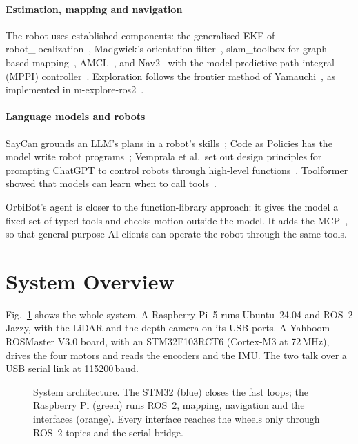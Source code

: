 \documentclass[11pt]{article}
\begin{document}
\paragraph{Estimation, mapping and navigation} The robot uses established components: the generalised EKF of robot\_localization~\cite{moore2014ekf}, Madgwick's orientation filter~\cite{madgwick2010}, slam\_toolbox for graph-based mapping~\cite{macenski2021slam}, AMCL~\cite{thrun2005probabilistic}, and Nav2~\cite{macenski2020nav2} with the model-predictive path integral (MPPI) controller~\cite{williams2017mppi}. Exploration follows the frontier method of Yamauchi~\cite{yamauchi1997frontier}, as implemented in m-explore-ros2~\cite{mexplore}.

\paragraph{Language models and robots} SayCan grounds an LLM's plans in a robot's skills~\cite{ahn2022saycan}; Code as Policies has the model write robot programs~\cite{liang2023code}; Vemprala et al.\ set out design principles for prompting ChatGPT to control robots through high-level functions~\cite{vemprala2024chatgpt}. Toolformer showed that models can learn when to call tools~\cite{schick2023toolformer}.

OrbiBot's agent is closer to the function-library approach: it gives the model a fixed set of typed tools and checks motion outside the model. It adds the MCP~\cite{mcp2024}, so that general-purpose AI clients can operate the robot through the same tools.

\section{System Overview}
\label{sec:overview}

Fig.~\ref{fig:arch} shows the whole system. A Raspberry Pi~5 runs Ubuntu~24.04 and ROS~2 Jazzy, with the LiDAR and the depth camera on its USB ports. A Yahboom ROSMaster V3.0 board, with an STM32F103RCT6 (Cortex-M3 at 72\,MHz), drives the four motors and reads the encoders and the IMU. The two talk over a USB serial link at 115200\,baud.

\begin{figure}[htbp]
  \centering
  \caption{System architecture. The STM32 (blue) closes the fast loops; the Raspberry Pi (green) runs ROS~2, mapping, navigation and the interfaces (orange). Every interface reaches the wheels only through ROS~2 topics and the serial bridge.}
  \label{fig:arch}
\end{figure}
\end{document}
